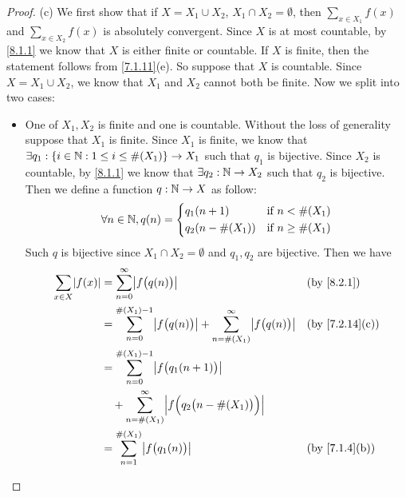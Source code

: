 \begin{proof}{(c)}
  We first show that if \(X = X_1 \cup X_2\), \(X_1 \cap X_2 = \emptyset\), then \(\sum_{x \in X_1} f(x)\) and \(\sum_{x \in X_2} f(x)\) is absolutely convergent.
  Since \(X\) is at most countable, by \cref{8.1.1} we know that \(X\) is either finite or countable.
  If \(X\) is finite, then the statement follows from \cref{7.1.11}(e).
  So suppose that \(X\) is countable.
  Since \(X = X_1 \cup X_2\), we know that \(X_1\) and \(X_2\) cannot both be finite.
  Now we split into two cases:
  \begin{itemize}
    \item One of \(X_1, X_2\) is finite and one is countable.
          Without the loss of generality suppose that \(X_1\) is finite.
          Since \(X_1\) is finite, we know that \(\exists q_1 : \left\lbrace i \in \mathbb{N} : 1 \leq i \leq \#(X_1)\right\rbrace \to X_1\) such that \(q_1\) is bijective.
          Since \(X_2\) is countable, by \cref{8.1.1} we know that \(\exists q_2 : \mathbb{N} \to X_2\) such that \(q_2\) is bijective.
          Then we define a function \(q : \mathbb{N} \to X\) as follow:
          \[
            \forall n \in \mathbb{N}, q(n) = \begin{dcases}
              q_1(n + 1)       & \text{if } n < \#(X_1)    \\
              q_2(n - \#(X_1)) & \text{if } n \geq \#(X_1)
            \end{dcases}
          \]
          Such \(q\) is bijective since \(X_1 \cap X_2 = \emptyset\) and \(q_1, q_2\) are bijective.
          Then we have
          \begin{align*}
            \sum_{x \in X} \abs{f(x)} & = \sum_{n = 0}^\infty \abs{f\big(q(n)\big)}                                                          &  & \by{8.2.1}                   \\
                                      & = \sum_{n = 0}^{\#(X_1) - 1} \abs{f\big(q(n)\big)} + \sum_{n = \#(X_1)}^\infty \abs{f\big(q(n)\big)} &  & \text{(by \cref{7.2.14}(c))} \\
                                      & = \sum_{n = 0}^{\#(X_1) - 1} \abs{f\big(q_1(n + 1)\big)}                                                                               \\
                                      & \quad + \sum_{n = \#(X_1)}^\infty \abs{f\Big(q_2\big(n - \#(X_1)\big)\Big)}                                                            \\
                                      & = \sum_{n = 1}^{\#(X_1)} \abs{f\big(q_1(n)\big)}                                                     &  & \text{(by \cref{7.1.4}(b))}  \\

\end{align*}
\end{itemize}
\end{proof}
